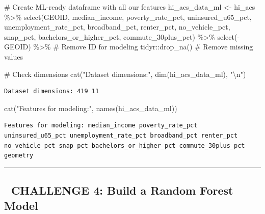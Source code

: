 \documentclass[
  letterpaper,
  DIV=11,
  numbers=noendperiod]{scrartcl}
\newenvironment{Shaded}{\begin{snugshade}}{\end{snugshade}}
\newcommand{\CommentTok}[1]{\textcolor[rgb]{0.37,0.37,0.37}{#1}}
\newcommand{\FunctionTok}[1]{\textcolor[rgb]{0.28,0.35,0.67}{#1}}
\newcommand{\NormalTok}[1]{\textcolor[rgb]{0.00,0.23,0.31}{#1}}
\newcommand{\OtherTok}[1]{\textcolor[rgb]{0.00,0.23,0.31}{#1}}
\newcommand{\SpecialCharTok}[1]{\textcolor[rgb]{0.37,0.37,0.37}{#1}}
\newcommand{\StringTok}[1]{\textcolor[rgb]{0.13,0.47,0.30}{#1}}
\begin{document}
\begin{Shaded}
\begin{Highlighting}[]
\CommentTok{\# Create ML{-}ready dataframe with all our features}
\NormalTok{hi\_acs\_data\_ml }\OtherTok{\textless{}{-}}\NormalTok{ hi\_acs }\SpecialCharTok{\%\textgreater{}\%}
  \FunctionTok{select}\NormalTok{(GEOID, median\_income, poverty\_rate\_pct, uninsured\_u65\_pct, }
\NormalTok{         unemployment\_rate\_pct, broadband\_pct, renter\_pct, no\_vehicle\_pct, }
\NormalTok{         snap\_pct, bachelors\_or\_higher\_pct, commute\_30plus\_pct) }\SpecialCharTok{\%\textgreater{}\%}
  \FunctionTok{select}\NormalTok{(}\SpecialCharTok{{-}}\NormalTok{GEOID) }\SpecialCharTok{\%\textgreater{}\%}                              \CommentTok{\# Remove ID for modeling}
\NormalTok{  tidyr}\SpecialCharTok{::}\FunctionTok{drop\_na}\NormalTok{()                                }\CommentTok{\# Remove missing values}

\CommentTok{\# Check dimensions}
\FunctionTok{cat}\NormalTok{(}\StringTok{"Dataset dimensions:"}\NormalTok{, }\FunctionTok{dim}\NormalTok{(hi\_acs\_data\_ml), }\StringTok{"}\SpecialCharTok{\textbackslash{}n}\StringTok{"}\NormalTok{)}
\end{Highlighting}
\end{Shaded}

\begin{verbatim}
Dataset dimensions: 419 11 
\end{verbatim}

\begin{Shaded}
\begin{Highlighting}[]
\FunctionTok{cat}\NormalTok{(}\StringTok{"Features for modeling:"}\NormalTok{, }\FunctionTok{names}\NormalTok{(hi\_acs\_data\_ml))}
\end{Highlighting}
\end{Shaded}

\begin{verbatim}
Features for modeling: median_income poverty_rate_pct uninsured_u65_pct unemployment_rate_pct broadband_pct renter_pct no_vehicle_pct snap_pct bachelors_or_higher_pct commute_30plus_pct geometry
\end{verbatim}

\begin{center}\rule{0.5\linewidth}{0.5pt}\end{center}

\subsection{🎯 CHALLENGE 4: Build a Random Forest
Model}\label{challenge-4-build-a-random-forest-model}
\end{document}
